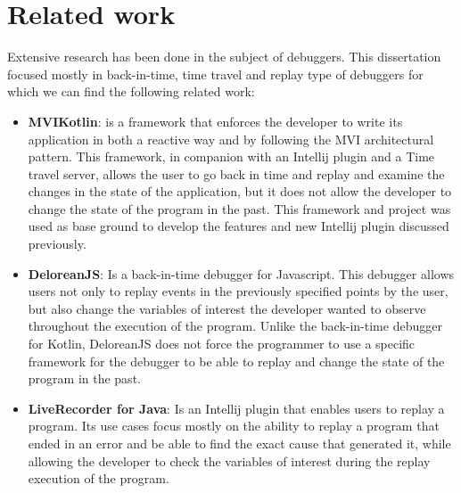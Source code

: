 \chapter{Related work}
\label{cha:related-work}

Extensive research has been done in the subject of debuggers. This dissertation focused mostly in back-in-time, time travel and replay type of debuggers for which we can find the following related work:

\begin{itemize}
 \item \textbf{MVIKotlin}: is a framework that enforces the developer to write its application in both a reactive way and by following the MVI architectural pattern. This framework, in companion with an Intellij plugin and a Time travel server, allows the user to go back in time and replay and examine the changes in the state of the application, but it does not allow the developer to change the state of the program in the past. This framework and project was used as base ground to develop the features and new Intellij plugin discussed previously.
 \item \textbf{DeloreanJS}: Is a back-in-time debugger for Javascript. This debugger allows users not only to replay events in the previously specified points by the user, but also change the variables of interest the developer wanted to observe throughout the execution of the program. Unlike the back-in-time debugger for Kotlin, DeloreanJS does not force the programmer to use a specific framework for the debugger to be able to replay and change the state of the program in the past.
 \item \textbf{LiveRecorder for Java}: Is an Intellij plugin that enables users to replay a program. Its use cases focus mostly on the ability to replay a program that ended in an error and be able to find the exact cause that generated it, while allowing the developer to check the variables of interest during the replay execution of the program.
\end{itemize}